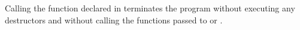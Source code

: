 \pnum
{}%
%
%
Calling the function  declared in
 terminates the program without executing any destructors
and without calling
the functions passed to  or .%
